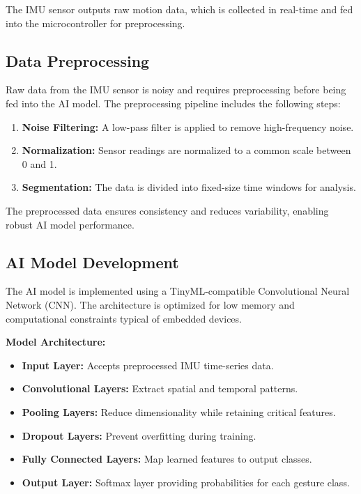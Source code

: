 \documentclass[
  9pt,
  letterpaper,
  abstract,
  titlepage]{scrbook}
\begin{document}
The IMU sensor outputs raw motion data, which is collected in real-time
and fed into the microcontroller for preprocessing.

\subsection{Data Preprocessing}\label{data-preprocessing}

Raw data from the IMU sensor is noisy and requires preprocessing before
being fed into the AI model. The preprocessing pipeline includes the
following steps:

\begin{enumerate}
\def\labelenumi{\arabic{enumi}.}
\item
  \textbf{Noise Filtering:} A low-pass filter is applied to remove
  high-frequency noise.
\item
  \textbf{Normalization:} Sensor readings are normalized to a common
  scale between 0 and 1.
\item
  \textbf{Segmentation:} The data is divided into fixed-size time
  windows for analysis.
\end{enumerate}

The preprocessed data ensures consistency and reduces variability,
enabling robust AI model performance.

\subsection{AI Model Development}\label{ai-model-development}

The AI model is implemented using a TinyML-compatible Convolutional
Neural Network (CNN). The architecture is optimized for low memory and
computational constraints typical of embedded devices.

\textbf{Model Architecture:}

\begin{itemize}
\item
  \textbf{Input Layer:} Accepts preprocessed IMU time-series data.
\item
  \textbf{Convolutional Layers:} Extract spatial and temporal patterns.
\item
  \textbf{Pooling Layers:} Reduce dimensionality while retaining
  critical features.
\item
  \textbf{Dropout Layers:} Prevent overfitting during training.
\item
  \textbf{Fully Connected Layers:} Map learned features to output
  classes.
\item
  \textbf{Output Layer:} Softmax layer providing probabilities for each
  gesture class.
\end{itemize}
\end{document}
